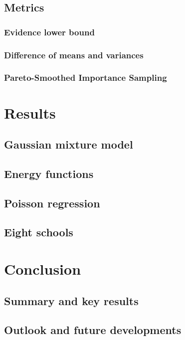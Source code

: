 \documentclass[10pt,a4paper,twocolumn]{article}
\begin{document}
\subsection{Metrics}

\subsubsection{Evidence lower bound}

\subsubsection{Difference of means and variances}

\subsubsection{Pareto-Smoothed Importance Sampling}

\section{Results}

\subsection{Gaussian mixture model}

\subsection{Energy functions}

\subsection{Poisson regression}

\subsection{Eight schools}

\section{Conclusion}

\subsection{Summary and key results}

\subsection{Outlook and future developments}



\printbibliography
\end{document}

